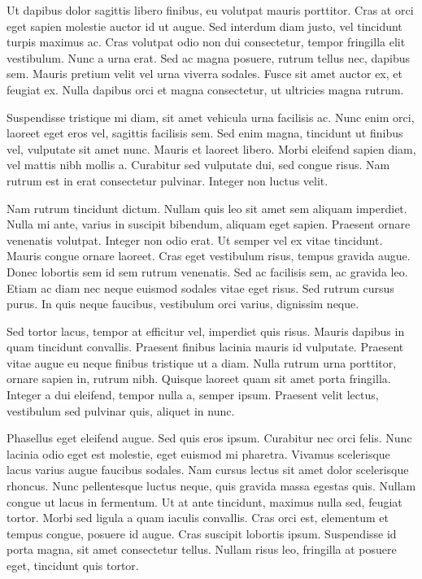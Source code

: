 \documentclass{homework}
\begin{document}
Ut dapibus dolor sagittis libero finibus, eu volutpat mauris porttitor. Cras at orci eget sapien molestie auctor id ut augue. Sed interdum diam justo, vel tincidunt turpis maximus ac. Cras volutpat odio non dui consectetur, tempor fringilla elit vestibulum. Nunc a urna erat. Sed ac magna posuere, rutrum tellus nec, dapibus sem. Mauris pretium velit vel urna viverra sodales. Fusce sit amet auctor ex, et feugiat ex. Nulla dapibus orci et magna consectetur, ut ultricies magna rutrum.

Suspendisse tristique mi diam, sit amet vehicula urna facilisis ac. Nunc enim orci, laoreet eget eros vel, sagittis facilisis sem. Sed enim magna, tincidunt ut finibus vel, vulputate sit amet nunc. Mauris et laoreet libero. Morbi eleifend sapien diam, vel mattis nibh mollis a. Curabitur sed vulputate dui, sed congue risus. Nam rutrum est in erat consectetur pulvinar. Integer non luctus velit.

Nam rutrum tincidunt dictum. Nullam quis leo sit amet sem aliquam imperdiet. Nulla mi ante, varius in suscipit bibendum, aliquam eget sapien. Praesent ornare venenatis volutpat. Integer non odio erat. Ut semper vel ex vitae tincidunt. Mauris congue ornare laoreet. Cras eget vestibulum risus, tempus gravida augue. Donec lobortis sem id sem rutrum venenatis. Sed ac facilisis sem, ac gravida leo. Etiam ac diam nec neque euismod sodales vitae eget risus. Sed rutrum cursus purus. In quis neque faucibus, vestibulum orci varius, dignissim neque.

Sed tortor lacus, tempor at efficitur vel, imperdiet quis risus. Mauris dapibus in quam tincidunt convallis. Praesent finibus lacinia mauris id vulputate. Praesent vitae augue eu neque finibus tristique ut a diam. Nulla rutrum urna porttitor, ornare sapien in, rutrum nibh. Quisque laoreet quam sit amet porta fringilla. Integer a dui eleifend, tempor nulla a, semper ipsum. Praesent velit lectus, vestibulum sed pulvinar quis, aliquet in nunc.

Phasellus eget eleifend augue. Sed quis eros ipsum. Curabitur nec orci felis. Nunc lacinia odio eget est molestie, eget euismod mi pharetra. Vivamus scelerisque lacus varius augue faucibus sodales. Nam cursus lectus sit amet dolor scelerisque rhoncus. Nunc pellentesque luctus neque, quis gravida massa egestas quis. Nullam congue ut lacus in fermentum. Ut at ante tincidunt, maximus nulla sed, feugiat tortor. Morbi sed ligula a quam iaculis convallis. Cras orci est, elementum et tempus congue, posuere id augue. Cras suscipit lobortis ipsum. Suspendisse id porta magna, sit amet consectetur tellus. Nullam risus leo, fringilla at posuere eget, tincidunt quis tortor.
\end{document}
